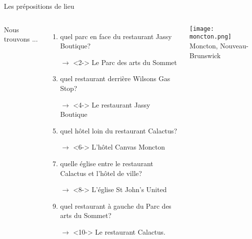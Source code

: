 \documentclass{beamer}
\begin{document}
  \begin{frame}{Les prépositions de lieu}
    \begin{columns}
        {\scriptsize
        Nous trouvons ...
        \begin{enumerate}
          \item quel parc en face du restaurant Jassy Boutique?
          \item[$\to$]<2-> Le Parc des arts du Sommet
          \item<3-> quel restaurant derrière Wilsons Gas Stop?
          \item[$\to$]<4-> Le restaurant Jassy Boutique
          \item<5-> quel hôtel loin du restaurant Calactus?
          \item[$\to$]<6-> L'hôtel Canvas Moncton
          \item<7-> quelle église entre le restaurant Calactus et l'hôtel de ville?
          \item[$\to$]<8-> L'église St John's United
          \item<9-> quel restaurant à gauche du Parc des arts du Sommet?
          \item[$\to$]<10-> Le restaurant Calactus.
        \end{enumerate}
        }
        \begin{minipage}[c][0.6\textheight]{\linewidth}
          \begin{center}
            \texttt{[image: moncton.png]} \\
            Moncton, Nouveau-Brunswick
          \end{center}
        \end{minipage}
    \end{columns}
  \end{frame}
\end{document}
